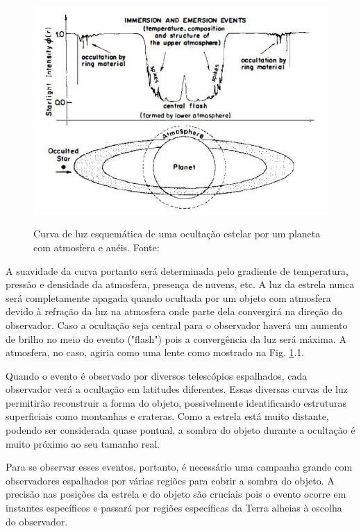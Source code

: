 \documentclass[12pt,a4paper]{monografia}
\begin{document}
\begin{figure}[h]
\begin{centering}
\includegraphics[scale=0.75]{figuras/stellarocc.png} 
\label{Fig: occ-scheme}
\caption{Curva de luz esquemática de uma ocultação estelar por um planeta com atmosfera e anéis. Fonte: \cite{Elliot1979}}
\end{centering} 
\end{figure}

A suavidade da curva portanto será determinada pelo gradiente de temperatura, pressão e densidade da atmosfera, presença de nuvens, etc. A luz da estrela nunca será completamente apagada quando ocultada por um objeto com atmosfera devido à refração da luz na atmosfera onde parte dela convergirá na direção do observador. Caso a ocultação seja central para o observador haverá um aumento de brilho no meio do evento ("flash") pois a convergência da luz será máxima. A atmosfera, no caso, agiria como uma lente como mostrado na Fig. \ref{Fig: occ-scheme}.1.

Quando o evento é observado por diversos telescópios espalhados, cada observador verá a ocultação em latitudes diferentes. Essas diversas curvas de luz permitirão reconstruir a forma do objeto, possivelmente identificando estruturas superficiais como montanhas e crateras. Como a estrela está muito distante, podendo ser considerada quase pontual, a sombra do objeto durante a ocultação é muito próximo ao seu tamanho real.

Para se observar esses eventos, portanto, é necessário uma campanha grande com observadores espalhados por várias regiões para cobrir a sombra do objeto. A precisão nas posições da estrela e do objeto são cruciais pois o evento ocorre em instantes específicos e passará por regiões específicas da Terra alheias à escolha do observador.
\end{document}
